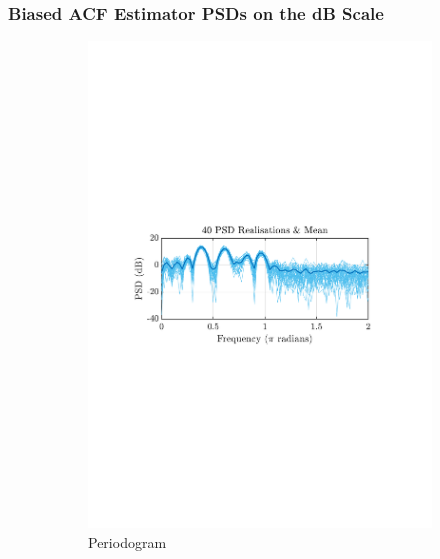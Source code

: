 \documentclass[12pt]{article}
\begin{document}
	\subsubsection{Biased ACF Estimator PSDs on the dB Scale}
	\begin{figure}[H]
		\centering
		\begin{subfigure}{0.49\textwidth}
			\centering
			\includegraphics[trim={2.2cm 11.2cm 3.15cm  11.2cm}, clip, width=\textwidth]{../MATLAB/figures/q1_3c_fig01.pdf} 
			\captionsetup{justification=centering}
			\caption{Periodogram}
		\end{subfigure}
		\begin{subfigure}{0.49\textwidth}
			\centering

\end{subfigure}
\end{figure}
\end{document}
